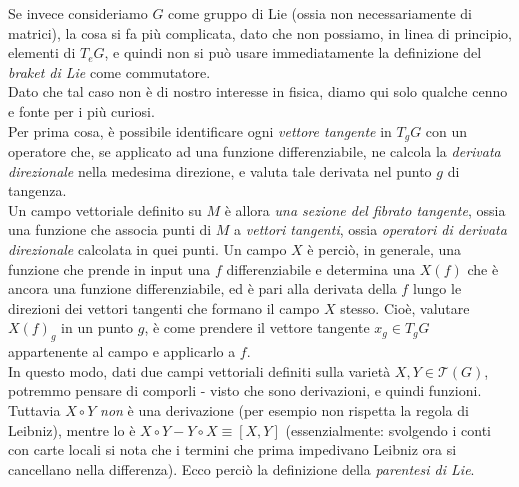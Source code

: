 \documentclass[../../FisicaTeorica.tex]{subfiles}
\begin{document}
\begin{expl}
Se invece consideriamo $G$ come gruppo di Lie  (ossia non necessariamente di matrici), la cosa si fa più complicata, dato che non possiamo, in linea di principio,  elementi di $T_e G$, e quindi non si può usare immediatamente la definizione del \textit{braket di Lie} come commutatore.\\
Dato che tal caso non è di nostro interesse in fisica, diamo qui solo qualche cenno e fonte per i più curiosi.\\
Per prima cosa, è possibile identificare ogni \textit{vettore tangente} in $T_g G$ con un operatore che, se applicato ad una funzione differenziabile, ne calcola la \textit{derivata direzionale} nella medesima direzione, e valuta tale derivata nel punto $g$ di tangenza.\\
Un campo vettoriale definito su $M$ è allora \textit{una sezione del fibrato tangente}, ossia una funzione che associa punti di $M$ a \textit{vettori tangenti}, ossia \textit{operatori di derivata direzionale} calcolata in quei punti. Un campo $X$ è perciò, in generale, una funzione che prende in input una $f$ differenziabile e determina una $X(f)$ che è ancora una funzione differenziabile, ed è pari alla derivata della $f$ lungo le direzioni dei vettori tangenti che formano il campo $X$ stesso. Cioè, valutare $X(f)_g$ in un punto $g$, è come prendere il vettore tangente $x_g \in T_g G$ appartenente al campo e applicarlo a $f$.\\
In questo modo, dati due campi vettoriali definiti sulla varietà $X, Y \in \mathcal{T}(G)$, potremmo pensare di comporli - visto che sono derivazioni, e quindi funzioni. Tuttavia $X\circ Y$ \textit{non} è una derivazione (per esempio non rispetta la regola di Leibniz), mentre lo è $X\circ Y - Y \circ X \equiv [X,Y]$ (essenzialmente: svolgendo i conti con carte locali si nota che i termini che prima impedivano Leibniz ora si cancellano nella differenza). Ecco perciò la definizione della \textit{parentesi di Lie}.\\


\end{expl}
\end{document}
